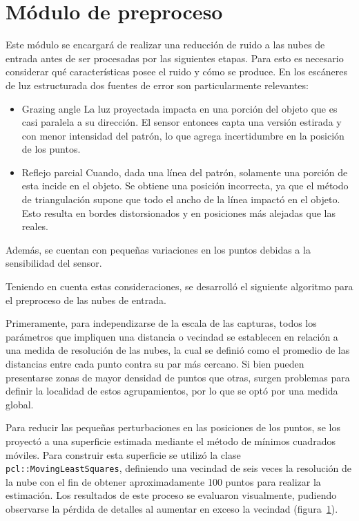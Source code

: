 \section{Módulo de preproceso}
Este módulo se encargará de realizar una reducción de ruido a las nubes de entrada
antes de ser procesadas por las siguientes etapas.
Para esto es necesario considerar
qué características posee el ruido y cómo se produce.
En los escáneres de luz estructurada dos fuentes de error son particularmente relevantes:
\begin{itemize}
	\item Grazing angle %
		La luz proyectada impacta en una porción del objeto que es casi paralela a su dirección.
		El sensor entonces capta una versión estirada y con menor intensidad del patrón, lo que 
		agrega incertidumbre en la posición de los puntos.
	\item Reflejo parcial %
		Cuando, dada una línea del patrón, solamente una porción de esta incide en el objeto.
		Se obtiene una posición incorrecta, ya que el método de triangulación
		supone que todo el ancho de la línea impactó en el objeto.
		Esto resulta en bordes distorsionados y en posiciones más alejadas que las reales.\cite{Turk:1994:ZPM:192161.192241}
\end{itemize}
Además, se cuentan con pequeñas variaciones en los puntos debidas a la sensibilidad del sensor.

Teniendo en cuenta estas consideraciones, se desarrolló el siguiente algoritmo
para el preproceso de las nubes de entrada.

Primeramente, para independizarse de la escala de las capturas,
todos los parámetros que impliquen una distancia o vecindad
se establecen en relación a una medida de resolución de las nubes,
la cual se definió como el promedio de las distancias entre cada punto
contra su par más cercano.
Si bien pueden presentarse zonas de mayor densidad de puntos que otras,
surgen problemas para definir la localidad de estos agrupamientos,
por lo que se optó por una medida global.

Para reducir las pequeñas perturbaciones en las posiciones de los puntos,
se los proyectó a una superficie estimada mediante el método de mínimos cuadrados móviles.
Para construir esta superficie se utilizó la clase
\texttt{pcl::Moving\-Least\-Squares}, definiendo una vecindad de seis veces la
resolución de la nube con el fin de obtener aproximadamente 100 puntos para
realizar la estimación.
Los resultados de este proceso se evaluaron visualmente, pudiendo observarse la pérdida de detalles
al aumentar en exceso la vecindad (figura~\ref{fig:mls}).
\begin{figure}
	\caption{\label{fig:mls}}
\end{figure}

